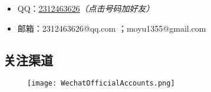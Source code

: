 \documentclass[11pt,a4paper,UTF8,titlepage]{ctexrep} %
\begin{document}
    \begin{itemize}
        \item QQ：\href{tencent://AddContact/?fromId=45&fromSubId=1&subcmd=all&uin=2312463626&website=www.oicqzone.com}{2312463626}\emph{\color{red}（点击号码加好友）}
        \item 邮箱：2312463626@qq.com ；moyu1355@gmail.com
    \end{itemize}

    \subsection*{\bfseries \sffamily \hypertarget{follow}{关注渠道}}
    \vspace*{-1ex}
    \vspace*{-2ex}

    \begin{figure}[htbp]
        \centering
        \texttt{[image: WechatOfficialAccounts.png]}
    \end{figure}
    \vspace*{-4ex}
\end{document}
